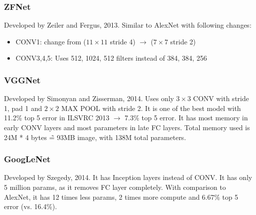 \documentclass[12pt,a4paper]{article}
\begin{document}
\subsubsection{ZFNet}
Developed by Zeiler and Fergus, 2013. Similar to AlexNet with following changes:
\begin{itemize}
    \item CONV1: change from ($11 \times 11$ stride 4) $\xrightarrow{}$ ($7 \times 7$ stride 2)
    \item CONV3,4,5: Uses 512, 1024, 512 filters instead of 384, 384, 256
\end{itemize}

\subsubsection{VGGNet}
Developed by Simonyan and Zisserman, 2014. Uses only $3 \times 3$ CONV with stride 1, pad 1 and $2 \times 2$ MAX POOL with stride 2. It is one of the best model with 11.2\% top 5 error in ILSVRC 2013 $\xrightarrow{}$ 7.3\% top 5 error. It has most memory in early CONV layers and most parameters in late FC layers. Total memory used is 24M * 4 bytes \~= 93MB \/ image, with 138M total parameters.

\subsubsection{GoogLeNet}
Developed by Szegedy, 2014. It has Inception layers instead of CONV. It has only 5 million params, as it removes FC layer completely. With comparison to AlexNet, it has 12 times less params, 2 times more compute and 6.67\% top 5 error (vs. 16.4\%).
\end{document}
